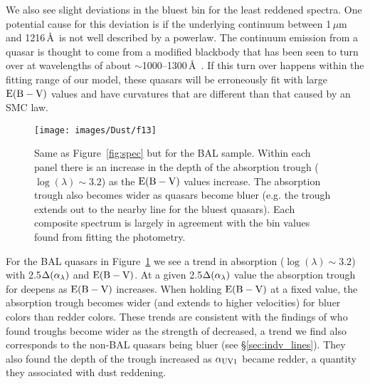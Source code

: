 We also see slight deviations in the bluest bin for the least reddened spectra.  One potential cause for this deviation is if the underlying continuum between 1\,$\mu$m and 1216\,\AA\ is not well described by a powerlaw.  The continuum emission from a quasar is thought to come from a modified blackbody \citep{Shakura:1976} that has been seen to turn over at wavelengths of about $\sim$1000--1300\,\AA\ \citep{Shang:2005}. If this turn over happens within the fitting range of our model, these quasars will be erroneously fit with large ${\rm E(B-V)}$ values and have curvatures that are different than that caused by an SMC law. %

\begin{figure*}
\begin{center}
\texttt{[image: images/Dust/f13]}
\caption[Composite spectra for BAL quasars]{\label{fig:bal_spec} 
Same as Figure~\ref{fig:spec} but for the BAL sample.
Within each panel there is an increase in the depth of the  absorption trough ($\log{(\lambda)}\sim3.2$) as the ${\rm E(B-V)}$ values increase.  The  absorption trough also becomes wider as quasars become bluer (e.g. the trough extends out to the nearby  line for the bluest quasars).
Each composite spectrum is largely in agreement with the bin values found from fitting the photometry.}
\end{center}
\end{figure*}

For the BAL quasars in Figure~\ref{fig:bal_spec} we see a trend in  absorption ($\log{(\lambda)}\sim3.2$) with 2.5$\Delta(\alpha_{\lambda})$ and ${\rm E(B-V)}$.  At a given 2.5$\Delta(\alpha_{\lambda})$ value the absorption trough for  deepens as ${\rm E(B-V)}$ increases.  When holding ${\rm E(B-V)}$ at a fixed value, the absorption trough becomes wider (and extends to higher velocities) 
for bluer colors than redder colors.  These trends are consistent with the findings of \citet{Baskin:2013} who found  troughs become wider as the strength of  decreased, a trend we find also corresponds to the non-BAL quasars being bluer (see \S\ref{sec:indv_lines}).  They also found the depth of the  trough increased as $\alpha_{\rm UV1}$ became redder, a quantity they associated with dust reddening.

